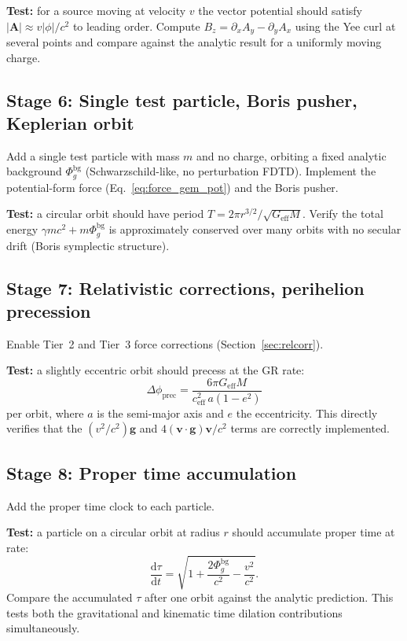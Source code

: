 \documentclass[11pt,a4paper]{article}
\newcommand{\vv}[1]{\mathbf{#1}}
\newcommand{\Phig}{\Phi_g}
\newcommand{\dd}{\mathrm{d}}
\begin{document}
\textbf{Test:} for a source moving at velocity $v$ the vector potential should satisfy $|\vv{A}| \approx v|\phi|/c^2$ to leading order.  Compute $B_z = \partial_x A_y - \partial_y A_x$ using the Yee curl at several points and compare against the analytic result for a uniformly moving charge.

\subsection{Stage 6: Single test particle, Boris pusher, Keplerian orbit}

Add a single test particle with mass $m$ and no charge, orbiting a fixed analytic background $\Phig^{\mathrm{bg}}$ (Schwarzschild-like, no perturbation FDTD).  Implement the potential-form force (Eq.~\ref{eq:force_gem_pot}) and the Boris pusher.

\textbf{Test:} a circular orbit should have period $T = 2\pi r^{3/2}/\sqrt{G_{\mathrm{eff}}M}$.  Verify the total energy $\gamma mc^2 + m\Phig^{\mathrm{bg}}$ is approximately conserved over many orbits with no secular drift (Boris symplectic structure).

\subsection{Stage 7: Relativistic corrections, perihelion precession}

Enable Tier~2 and Tier~3 force corrections (Section~\ref{sec:relcorr}).

\textbf{Test:} a slightly eccentric orbit should precess at the GR rate:
\begin{equation}
  \Delta\phi_{\mathrm{prec}} = \frac{6\pi G_{\mathrm{eff}} M}{c_{\mathrm{eff}}^2\,a(1-e^2)}
\end{equation}
per orbit, where $a$ is the semi-major axis and $e$ the eccentricity.  This directly verifies that the $(v^2/c^2)\vv{g}$ and $4(\vv{v}\cdot\vv{g})\vv{v}/c^2$ terms are correctly implemented.

\subsection{Stage 8: Proper time accumulation}

Add the proper time clock to each particle.

\textbf{Test:} a particle on a circular orbit at radius $r$ should accumulate proper time at rate:
\begin{equation}
  \frac{\dd\tau}{\dd t} = \sqrt{1 + \frac{2\Phig^{\mathrm{bg}}}{c^2} - \frac{v^2}{c^2}}.
\end{equation}
Compare the accumulated $\tau$ after one orbit against the analytic prediction.  This tests both the gravitational and kinematic time dilation contributions simultaneously.
\end{document}
